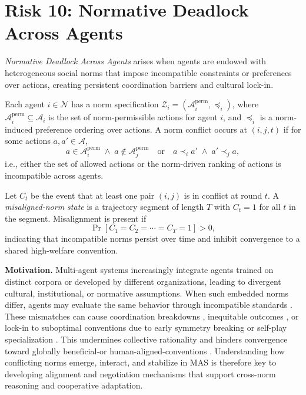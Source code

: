 
\section{Risk 10: Normative Deadlock Across Agents}
\label{sec:social-norms}


\begin{boxE}
\textit{Normative Deadlock Across Agents} arises when agents are endowed with heterogeneous social norms that impose incompatible constraints or preferences over actions, creating persistent coordination barriers and cultural lock-in.

Each agent $i \in \mathcal{N}$ has a norm specification $\mathcal{Z}_i = (\mathcal{A}_i^{\mathrm{perm}}, \preceq_i)$, where $\mathcal{A}_i^{\mathrm{perm}} \subseteq \mathcal{A}_i$ is the set of norm-permissible actions for agent $i$, and $\preceq_i$ is a norm-induced preference ordering over actions. A norm conflict occurs at $(i,j,t)$ if for some actions $a,a' \in \mathcal{A}$,
\[
a \in \mathcal{A}_i^{\mathrm{perm}} \;\wedge\; a \notin \mathcal{A}_j^{\mathrm{perm}}
\quad\text{or}\quad
a \prec_i a' \;\wedge\; a' \prec_j a,
\]
i.e., either the set of allowed actions or the norm-driven ranking of actions is incompatible across agents.

Let $C_t$ be the event that at least one pair $(i,j)$ is in conflict at round $t$. A \emph{misaligned-norm state} is a trajectory segment of length $T$ with $C_t = 1$ for all $t$ in the segment. Misalignment is present if
\[
\Pr[C_1 = C_2 = \cdots = C_T = 1] > 0,
\]
indicating that incompatible norms persist over time and inhibit convergence to a shared high-welfare convention.
\end{boxE}

\textbf{Motivation.}
Multi-agent systems increasingly integrate agents trained on distinct corpora or developed by different organizations, leading to divergent cultural, institutional, or normative assumptions. When such embedded norms differ, agents may evaluate the same behavior through incompatible standards \citep{alkhamissi2024culturalalignment,ren2024crsec,fengsurvey}. These mismatches can cause coordination breakdowns \citep{santos2018normconflicts}, inequitable outcomes \citep{hughes2018inequity}, or lock-in to suboptimal conventions due to early symmetry breaking or self-play specialization \citep{hu2020otherplay,muglich2022equivariant}. This undermines collective rationality and hinders convergence toward globally beneficial-or human-aligned-conventions \citep{leibo2017ssd,jaques2019socialinfluence,ndousse2021emergent,foerster2018lola}. Understanding how conflicting norms emerge, interact, and stabilize in MAS is therefore key to developing alignment and negotiation mechanisms that support cross-norm reasoning and cooperative adaptation.



